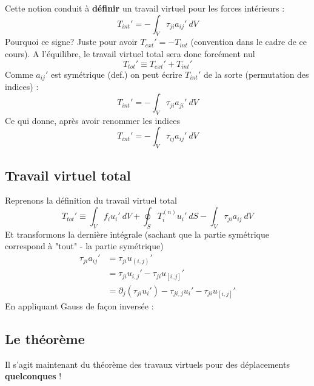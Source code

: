 	Cette notion conduit à \textbf{définir} un travail virtuel pour les forces 
	intérieurs :
	\begin{equation}
	T_{int}' = -\int_V\tau_{ji}a_{ij}'\ dV
	\end{equation}
	Pourquoi ce signe? Juste pour avoir $T_{ext}'=-T_{int}$ (convention dans le 
	cadre de ce cours). A l'équilibre, le travail virtuel total sera donc 
	forcément nul
	\begin{equation}
	T_{tot}' \equiv  T_{ext}'+T_{int}'
	\end{equation}
	Comme $a_{ij}'$ est symétrique (def.) on peut écrire $T_{int}'$ de la sorte 
	(permutation des indices) :
	\begin{equation}
	T_{int}' = -\int_V\tau_{ji}a_{ji}'\ dV
	\end{equation}
	Ce qui donne, après avoir renommer les indices
	\begin{equation}
	T_{int}' = -\int_V\tau_{ij}a_{ij}'\ dV
	\end{equation}
	
	\subsection{Travail virtuel total}
	Reprenons la définition du travail virtuel total
	\begin{equation}
	T_{tot}' \equiv \int_V f_iu_i'\ dV + \oint_S T_i^{(n)}u_i'\ dS - \int_V 
	\tau_{ji}a_{ij}\ dV
\end{equation}		
	Et transformons la dernière intégrale (sachant que la partie symétrique 
	correspond à "tout" - la partie symétrique)
	\begin{equation}
	\begin{array}{ll}
	\tau_{ji}a_{ij}' &= \tau_{ji}u_{(i,j)}'\\
	&= \tau_{ji}u_{i,j}' - \tau_{ji}u_{[i,j]}'\\
	&= \partial_j(\tau_{ji}u_i')-\tau_{ji,j}u_i'-\tau_{ji}u_{[i,j]}'
	\end{array}
	\end{equation}
	En appliquant Gauss de façon inversée :\\
	
	\subsection{Le théorème}
	Il s'agit maintenant du théorème des travaux virtuels pour des déplacements 
	\textbf{quelconques} !\
	
